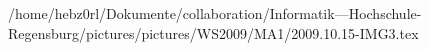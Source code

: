 /home/hebz0rl/Dokumente/collaboration/Informatik---Hochschule-Regensburg/pictures/pictures/WS2009/MA1/2009.10.15-IMG3.tex